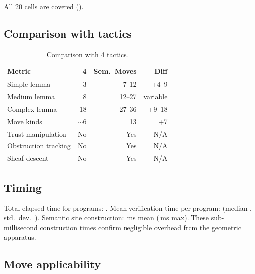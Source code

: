 \documentclass[11pt]{article}
\begin{document}
All 20 cells are covered ().

\subsection{Comparison with \LEAN{} tactics}\label{sec:eval-lean}

\begin{table}[t]
\centering
\caption{Comparison with \LEAN{} 4 tactics.}
\label{tab:lean-comparison}
\begin{tabular}{@{}lrrr@{}}
\toprule
\textbf{Metric} & \textbf{\LEAN{} 4}
  & \textbf{Sem.\ Moves} & \textbf{Diff} \\
\midrule
Simple lemma        & 3   & 7--12 & +4--9 \\
Medium lemma        & 8   & 12--27 & variable \\
Complex lemma       & 18  & 27--36 & +9--18 \\
Move kinds          & ${\sim}6$ & 13 & +7 \\
Trust manipulation  & No  & Yes & N/A \\
Obstruction tracking & No  & Yes & N/A \\
Sheaf descent       & No  & Yes & N/A \\
\bottomrule
\end{tabular}
\end{table}

\subsection{Timing}\label{sec:eval-timing}

Total elapsed time for \compTotalPrograms{} programs: \compTimeTotal.
Mean verification time per program: \compTimeMean{}
(median \compTimeMedian, std.\ dev.\ \compTimeStdev).
Semantic site construction: \compSiteMeanBuildMs\,ms mean
(\compSiteMaxBuildMs\,ms max).
These sub-millisecond construction times confirm negligible
overhead from the geometric apparatus.

\subsection{Move applicability}\label{sec:eval-failed}
\end{document}
